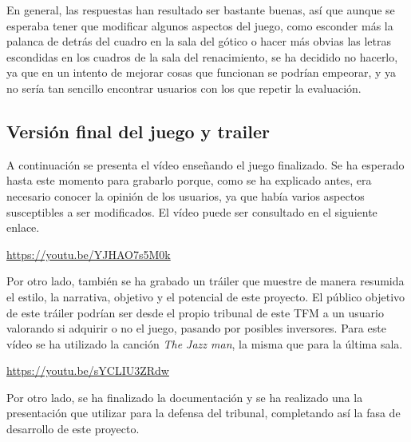 En general, las respuestas han resultado ser bastante buenas, así que aunque se esperaba tener que modificar algunos aspectos del juego, como esconder más la palanca de detrás del cuadro en la sala del gótico o hacer más obvias las letras escondidas en los cuadros de la sala del renacimiento, se ha decidido no hacerlo, ya que en un intento de mejorar cosas que funcionan se podrían empeorar, y ya no sería tan sencillo encontrar usuarios con los que repetir la evaluación.

\subsection{Versión final del juego y trailer}

A continuación se presenta el vídeo enseñando el juego finalizado. Se ha esperado hasta este momento para grabarlo porque, como se ha explicado antes, era necesario conocer la opinión de los usuarios, ya que había varios aspectos susceptibles a ser modificados. El vídeo puede ser consultado en el siguiente enlace.

\begin{center}
    \url{https://youtu.be/YJHAO7s5M0k}
\end{center}

Por otro lado, también se ha grabado un tráiler que muestre de manera resumida el estilo, la narrativa, objetivo y el potencial de este proyecto. El público objetivo de este tráiler podrían ser desde el propio tribunal de este \acs{TFM} a un usuario valorando si adquirir o no el juego, pasando por posibles inversores. Para este vídeo se ha utilizado la canción \textit{The Jazz man}, la misma que para la última sala.

\begin{center}
    \url{https://youtu.be/sYCLIU3ZRdw}
\end{center}

\bigskip

Por otro lado, se ha finalizado la documentación y se ha realizado una la presentación que utilizar para la defensa del tribunal, completando así la fasa de desarrollo de este proyecto.